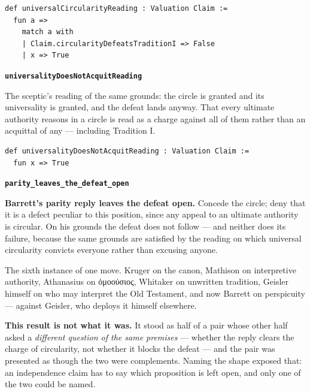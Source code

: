 \documentclass[11pt]{article}
\begin{document}
{\small\begin{verbatim}
def universalCircularityReading : Valuation Claim :=
  fun a =>
    match a with
    | Claim.circularityDefeatsTraditionI => False
    | x => True
\end{verbatim}}
\par\medskip\noindent\textbf{\texttt{universality\allowbreak{}Does\allowbreak{}Not\allowbreak{}Acquit\allowbreak{}Reading}}\par\nobreak\noindent
The sceptic's reading of the same grounds: the circle is granted and its universality is granted, and the defeat lands anyway. That every ultimate authority reasons in a circle is read as a charge against all of them rather than an acquittal of any — including Tradition I.

{\small\begin{verbatim}
def universalityDoesNotAcquitReading : Valuation Claim :=
  fun x => True
\end{verbatim}}
\par\medskip\noindent\textbf{\texttt{parity\_\allowbreak{}leaves\_\allowbreak{}the\_\allowbreak{}defeat\_\allowbreak{}open}}\par\nobreak\noindent
\textbf{Barrett's parity reply leaves the defeat open.} Concede the circle; deny that it is a defect peculiar to this position, since any appeal to an ultimate authority is circular. On his grounds the defeat does not follow — and neither does its failure, because the same grounds are satisfied by the reading on which universal circularity convicts everyone rather than excusing anyone.

The sixth instance of one move. Kruger on the canon, Mathison on interpretive authority, Athanasius on ὁμοούσιος, Whitaker on unwritten tradition, Geisler himself on who may interpret the Old Testament, and now Barrett on perspicuity — against Geisler, who deploys it himself elsewhere.

\textbf{This result is not what it was.} It stood as half of a pair whose other half asked a \emph{different question of the same premises} — whether the reply clears the charge of circularity, not whether it blocks the defeat — and the pair was presented as though the two were complements. Naming the shape exposed that: an independence claim has to say which proposition is left open, and only one of the two could be named.
\end{document}
